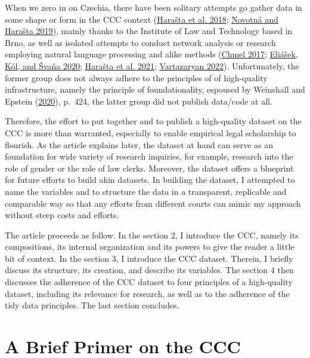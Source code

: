 \documentclass[
  11pt,
]{article}
\begin{document}
When we zero in on Czechia, there have been solitary attempts go gather
data in some shape or form in the CCC context
(\protect\hyperlink{ref-harastaAnnotatedCorpusCzech2018}{Harašta et al.
2018}; \protect\hyperlink{ref-novotnaCzechCourtDecisions2019}{Novotná
and Harašta 2019}), mainly thanks to the Institute of Law and Technology
based in Brno, as well as isolated attempts to conduct network analysis
or research employing natural language processing and alike methods
(\protect\hyperlink{ref-chmelZpravodajoveSenatyVliv2017}{Chmel 2017};
\protect\hyperlink{ref-eliasekAutomatickaKlasifikaceVyznamovych2020}{Eliášek,
Kól, and Švaňa 2020};
\protect\hyperlink{ref-harastaCitacniAnalyzaJudikatury2021}{Harašta et
al. 2021};
\protect\hyperlink{ref-vartazaryanSitOvaAnalyza2022}{Vartazaryan 2022}).
Unfortunately, the former group does not always adhere to the principles
of of high-quality infrastructure, namely the principle of
foundationality, espoused by Weinshall and Epstein
(\protect\hyperlink{ref-weinshallDevelopingHighQualityData2020}{2020}),
p.~424, the latter group did not publish data/code at all.

Therefore, the effort to put together and to publish a high-quality
dataset on the CCC is more than warranted, especially to enable
empirical legal scholarship to flourish. As the article explains later,
the dataset at hand can serve as an foundation for wide variety of
research inquiries, for example, research into the role of gender or the
role of law clerks. Moreover, the dataset offers a blueprint for future
efforts to build akin datasets. In building the dataset, I attempted to
name the variables and to structure the data in a transparent,
replicable and comparable way so that any efforts from different courts
can mimic my approach without steep costs and efforts.

The article proceeds as follow. In the section 2, I introduce the CCC,
namely its compositions, its internal organization and its powers to
give the reader a little bit of context. In the section 3, I introduce
the CCC dataset. Therein, I briefly discuss its structure, its creation,
and describe its variables. The section 4 then discusses the adherence
of the CCC dataset to four principles of a high-quality dataset,
including its relevance for research, as well as to the adherence of the
tidy data principles. The last section concludes.

\hypertarget{a-brief-primer-on-the-ccc}{%
\section{A Brief Primer on the CCC}\label{a-brief-primer-on-the-ccc}}
\end{document}
